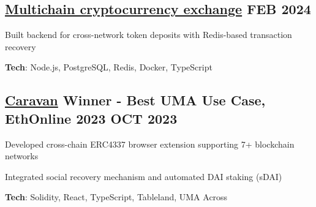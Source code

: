 \documentclass[letter,10pt]{article}
\begin{document}
\subsection{{ \href{https://github.com/Suhel-Kap/crypto-exchanger}{Multichain cryptocurrency exchange} \hfill FEB 2024}}
\begin{zitemize}
  \item Built backend for cross-network token deposits with Redis-based transaction recovery
  \item \textbf{Tech}: Node.js, PostgreSQL, Redis, Docker, TypeScript
\end{zitemize}

\subsection{{ \href{https://github.com/0xabh/caravan}{Caravan} Winner - Best UMA Use Case, EthOnline 2023 \hfill OCT 2023}}
\begin{zitemize}
  \item Developed cross-chain ERC4337 browser extension supporting 7+ blockchain networks
  \item Integrated social recovery mechanism and automated DAI staking (sDAI)
  \item \textbf{Tech}: Solidity, React, TypeScript, Tableland, UMA Across
\end{zitemize}
\end{document}
